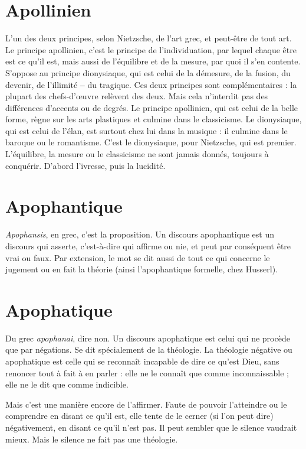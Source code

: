 \section{Apollinien}
L’un des deux principes, selon Nietzsche, de l’art grec, et peut-être
de tout art. Le principe apollinien, c’est le principe de
l'individuation, par lequel chaque être est ce qu’il est, mais aussi de l'équilibre
et de la mesure, par quoi il s’en contente. S’oppose au principe dionysiaque,
qui est celui de la démesure, de la fusion, du devenir, de l’illimité {\bf --} du tragique.
Ces deux principes sont complémentaires : la plupart des chefs-d’œuvre relèvent
des deux. Mais cela n’interdit pas des différences d’accents ou de degrés.
Le principe apollinien, qui est celui de la belle forme, règne sur les arts plastiques
et culmine dans le classicisme. Le dionysiaque, qui est celui de l’élan, est
surtout chez lui dans la musique : il culmine dans le baroque ou le romantisme.
C’est le dionysiaque, pour Nietzsche, qui est premier. L'équilibre, la
mesure ou le classicisme ne sont jamais donnés, toujours à conquérir. D’abord
l'ivresse, puis la lucidité.

\section{Apophantique}
{\it Apophansis}, en grec, c’est la proposition. Un discours
apophantique est un discours qui asserte, c’est-à-dire qui
affirme ou nie, et peut par conséquent être vrai ou faux. Par extension, le mot
se dit aussi de tout ce qui concerne le jugement ou en fait la théorie (ainsi l’apophantique
formelle, chez Husserl).

\section{Apophatique}
Du grec {\it apophanai}, dire non. Un discours apophatique
est celui qui ne procède que par négations. Se dit spécialement
de la théologie. La théologie négative ou apophatique est celle qui se
reconnaît incapable de dire ce qu’est Dieu, sans renoncer tout à fait à en parler :
elle ne le connaît que comme inconnaissable ; elle ne le dit que comme indicible.

Mais c’est une manière encore de l’affirmer. Faute de pouvoir l’atteindre
ou le comprendre en disant ce qu’il est, elle tente de le cerner (si l’on peut dire)
négativement, en disant ce qu’il n’est pas. Il peut sembler que le silence vaudrait
mieux. Mais le silence ne fait pas une théologie.

